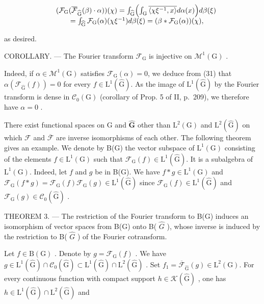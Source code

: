 \[
\begin{array}{r l} & {(\mathcal {F} _ {\mathrm{G}} (\overline {{\mathcal {F}}} _ {\widehat {\mathrm{G}}} (\beta) \cdot \alpha)) (\chi) = \int_ {\widehat {\mathrm{G}}} \Bigl (\int_ {\mathrm{G}} \overline {{\langle \chi \xi^ {- 1} , x \rangle}} d \alpha (x) \Bigr) d \beta (\xi)} \\ & {\qquad = \int_ {\widehat {\mathrm{G}}} \mathcal {F} _ {\mathrm{G}} (\alpha) (\chi \xi^ {- 1}) d \beta (\xi) = (\beta * \mathcal {F} _ {\mathrm{G}} (\alpha)) (\chi),} \end{array}
\]

as desired.

COROLLARY. --- The Fourier transform \(\mathcal{F}_{\mathrm{G}}\) is injective on \(\mathcal{M}^{1}(\mathrm{G})\) .

Indeed, if \(\alpha \in \mathcal{M}^1 (\mathrm{G})\) satisfies \(\mathcal{F}_{\mathrm{G}}(\alpha) = 0\), we deduce from (31) that \(\alpha (\mathcal{F}_{\widehat{\mathrm{G}}} (f)) = 0\) for every \(f\in \mathrm{L}^{1}(\widehat{\mathrm{G}})\). As the image of \(\mathrm{L}^1 (\widehat{\mathrm{G}})\) by the Fourier transform is dense in \(\mathcal{C}_0(\mathrm{G})\) (corollary of Prop. 5 of II, p.~209), we therefore have \(\alpha = 0\) .

There exist functional spaces on G and \(\widehat{\mathbf{G}}\) other than \(\mathrm{L}^2 (\mathrm{G})\) and \(\mathrm{L}^2 (\widehat{\mathrm{G}})\) on which \(\mathcal{F}\) and \(\overline{\mathcal{F}}\) are inverse isomorphisms of each other. The following theorem gives an example. We denote by B(G) the vector subspace of \(\mathrm{L}^1 (\mathrm{G})\) consisting of the elements \(f\in \mathrm{L}^1 (\mathrm{G})\) such that \(\mathcal{F}_{\mathrm{G}}(f)\in \mathrm{L}^1 (\widehat{\mathrm{G}})\). It is a subalgebra of \(\mathrm{L}^1 (\mathrm{G})\). Indeed, let \(f\) and \(g\) be in B(G). We have \(f*g\in \mathrm{L}^1 (\mathrm{G})\) and \(\mathcal{F}_{\mathrm{G}}(f*g) = \mathcal{F}_{\mathrm{G}}(f)\mathcal{F}_{\mathrm{G}}(g)\in \mathrm{L}^1 (\widehat{\mathrm{G}})\) since \(\mathcal{F}_{\mathrm{G}}(f)\in \mathrm{L}^1 (\widehat{\mathrm{G}})\) and \(\mathcal{F}_{\mathrm{G}}(g)\in \mathcal{C}_0(\widehat{\mathrm{G}})\) .

THEOREM 3. --- The restriction of the Fourier transform to B(G) induces an isomorphism of vector spaces from B(G) onto B( \(\widehat{G}\) ), whose inverse is induced by the restriction to B( \(\widehat{G}\) ) of the Fourier cotransform.

Let \(f \in \mathrm{B}(\mathrm{G})\) . Denote by \(g = \mathcal{F}_{\mathrm{G}}(f)\) . We have \(g \in \mathrm{L}^1(\widehat{\mathrm{G}}) \cap \mathcal{C}_0(\widehat{\mathrm{G}}) \subset \mathrm{L}^1(\widehat{\mathrm{G}}) \cap \mathrm{L}^2(\widehat{\mathrm{G}})\) . Set \(f_1 = \overline{\mathcal{F}}_{\widehat{\mathrm{G}}} (g) \in \mathrm{L}^2(\mathrm{G})\). For every continuous function with compact support \(h \in \mathcal{K}(\widehat{\mathrm{G}})\) , one has \(h \in \mathrm{L}^1(\widehat{\mathrm{G}}) \cap \mathrm{L}^2(\widehat{\mathrm{G}})\) and

